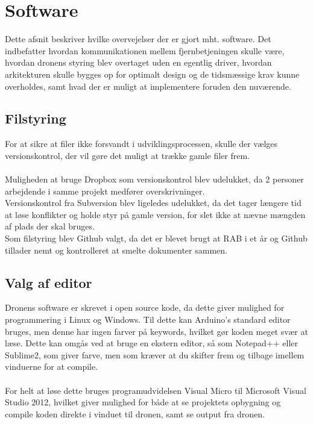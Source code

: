 \documentclass[Main]{subfiles}
\begin{document}
\chapter{Software}
Dette afsnit beskriver hvilke overvejelser der er gjort mht. software.
Det indbefatter hvordan kommunikationen mellem fjernbetjeningen skulle være, hvordan dronens styring blev overtaget uden en egentlig driver, hvordan arkitekturen skulle bygges op for optimalt design og de tidsmæssige krav kunne overholdes, samt hvad der er muligt at implementere foruden den nuværende.



\section{Filstyring}
For at sikre at filer ikke forsvandt i udviklingsprocessen, skulle der vælges  versionskontrol, der vil gøre det muligt at trække gamle filer frem.
\\
\\
Muligheden at bruge Dropbox som versionskontrol blev udelukket, da 2 personer arbejdende i samme projekt medfører overskrivninger.
\\
Versionskontrol fra Subversion blev ligeledes udelukket, da det tager længere tid at løse konflikter og holde styr på gamle version, for slet ikke at nævne mængden af plads der skal bruges.
\\
Som filstyring blev Github valgt, da det er blevet brugt at RAB i et år og Github tillader nemt og kontrolleret at smelte dokumenter sammen.





\section{Valg af editor}
Dronens software er skrevet i open source kode, da dette giver mulighed for programmering i Linux og Windows.
Til dette kan Arduino's standard editor bruges, men denne har ingen farver på keywords, hvilket gør koden meget svær at læse.
Dette kan omgås ved at bruge en ekstern editor, så som Notepad++ eller Sublime2, som giver farve, men som kræver at du skifter frem og tilbage imellem vinduerne for at compile.
\\
\\
For helt at løse dette bruges programudvidelsen Visual Micro til Microsoft Visual Studio 2012, hvilket giver mulighed for både at se projektets opbygning og compile koden direkte i vinduet til dronen, samt se output fra dronen.
\end{document}
